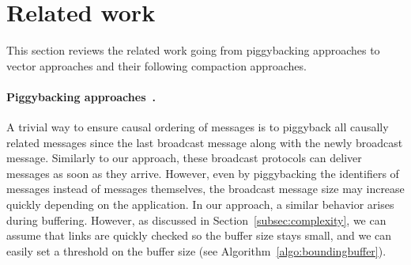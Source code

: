 
\section{Related work}
\label{sec:relatedwork}

This section reviews the related work going from piggybacking approaches to
vector approaches and their following compaction approaches.

\paragraph{Piggybacking
  approaches~\cite{birman1987reliable,hadzilacos1993fault}.}
A trivial way to ensure causal ordering of messages is to piggyback all causally
related messages since the last broadcast message along with the newly broadcast
message. Similarly to our approach, these broadcast protocols can deliver
messages as soon as they arrive.  However, even by piggybacking the identifiers
of messages instead of messages themselves, the broadcast message size may
increase quickly depending on the application. In our approach, a similar
behavior arises during buffering. However, as discussed in
Section~\ref{subsec:complexity}, we can assume that links are quickly checked so
the buffer size stays small, and we can easily set a threshold on the buffer
size (see Algorithm~\ref{algo:boundingbuffer}).

